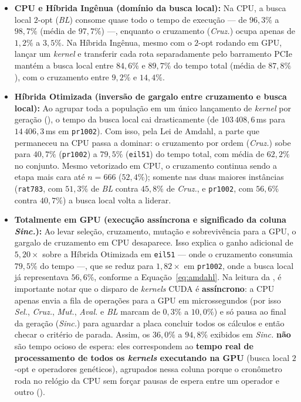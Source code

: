 \begin{itemize}
  \item
        \textbf{CPU e Híbrida Ingênua (domínio da busca local):} Na CPU, a busca local \(2\)-opt (\textit{BL}) consome quase todo o tempo de execução --- de \(96{,}3\%\) a \(98{,}7\%\) (média de \(97{,}7\%\)) ---, enquanto o cruzamento (\textit{Cruz.}) ocupa apenas de \(1{,}2\%\) a \(3{,}5\%\). Na Híbrida Ingênua, mesmo com o \(2\)-opt rodando em GPU, lançar um \emph{kernel} e transferir cada rota separadamente pelo barramento PCIe mantém a busca local entre \(84{,}6\%\) e \(89{,}7\%\) do tempo total (média de \(87{,}8\%\)), com o cruzamento entre \(9{,}2\%\) e \(14{,}4\%\).
  \item
        \textbf{Híbrida Otimizada (inversão de gargalo entre cruzamento e busca local):} Ao agrupar toda a população em um único lançamento de \emph{kernel} por geração (), o tempo da busca local cai drasticamente (de \(103\,408{,}6\)\,ms para \(14\,406{,}3\)\,ms em \texttt{pr1002}). Com isso, pela Lei de Amdahl, a parte que permaneceu na CPU passa a dominar: o cruzamento por ordem (\textit{Cruz.}) sobe para \(40{,}7\%\) (\texttt{pr1002}) a \(79{,}5\%\) (\texttt{eil51}) do tempo total, com média de \(62{,}2\%\) no conjunto. Mesmo vetorizado em CPU, o cruzamento continua sendo a etapa mais cara até \(n = 666\) (\(52{,}4\%\)); somente nas duas maiores instâncias (\texttt{rat783}, com \(51{,}3\%\) de \textit{BL} contra \(45{,}8\%\) de \textit{Cruz.}, e \texttt{pr1002}, com \(56{,}6\%\) contra \(40{,}7\%\)) a busca local volta a liderar.
  \item
        \textbf{Totalmente em GPU (execução assíncrona e significado da coluna \textit{Sinc.}):} Ao levar seleção, cruzamento, mutação e sobrevivência para a GPU, o gargalo de cruzamento em CPU desaparece. Isso explica o ganho adicional de \(5{,}20\times\) sobre a Híbrida Otimizada em \texttt{eil51} --- onde o cruzamento consumia \(79{,}5\%\) do tempo ---, que se reduz para \(1{,}82\times\) em \texttt{pr1002}, onde a busca local já representava \(56{,}6\%\), conforme a Equação~\eqref{eq:amdahl}.
        Na leitura da , é importante notar que o disparo de \emph{kernels} CUDA é \textbf{assíncrono}: a CPU apenas envia a fila de operações para a GPU em microssegundos (por isso \textit{Sel.}, \textit{Cruz.}, \textit{Mut.}, \textit{Aval.} e \textit{BL} marcam de \(0{,}3\%\) a \(10{,}0\%\)) e só pausa ao final da geração (\textit{Sinc.}) para aguardar a placa concluir todos os cálculos e então checar o critério de parada.
        Assim, os \(36{,}0\%\) a \(94{,}8\%\) exibidos em \textit{Sinc.} \textbf{não} são tempo ocioso de espera: eles correspondem ao \textbf{tempo real de processamento de todos os \emph{kernels} executando na GPU} (busca local \(2\)-opt e operadores genéticos), agrupados nessa coluna porque o cronômetro roda no relógio da CPU sem forçar pausas de espera entre um operador e outro ().
\end{itemize}

